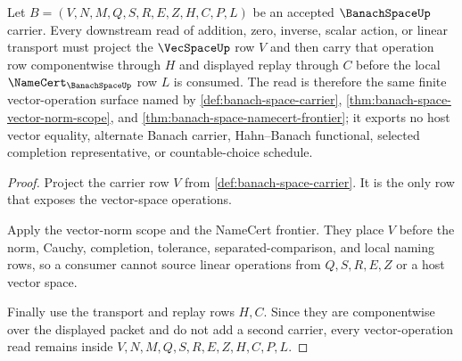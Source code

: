 \begin{theorem}
\label{thm:banach-space-vector-operation-transport-obligation}
Let $B=(V,N,M,Q,S,R,E,Z,H,C,P,L)$ be an accepted $\BanachSpaceUp$ carrier. Every downstream read of addition, zero, inverse, scalar action, or linear transport must project the $\VecSpaceUp$ row $V$ and then carry that operation row componentwise through $H$ and displayed replay through $C$ before the local $\NameCert_{\BanachSpaceUp}$ row $L$ is consumed. The read is therefore the same finite vector-operation surface named by \autoref{def:banach-space-carrier}, \autoref{thm:banach-space-vector-norm-scope}, and \autoref{thm:banach-space-namecert-frontier}; it exports no host vector equality, alternate Banach carrier, Hahn--Banach functional, selected completion representative, or countable-choice schedule.
\end{theorem}
\begin{proof}
Project the carrier row $V$ from \autoref{def:banach-space-carrier}. It is the only row that exposes the vector-space operations.

Apply the vector-norm scope and the NameCert frontier. They place $V$ before the norm, Cauchy, completion, tolerance, separated-comparison, and local naming rows, so a consumer cannot source linear operations from $Q,S,R,E,Z$ or a host vector space.

Finally use the transport and replay rows $H,C$. Since they are componentwise over the displayed packet and do not add a second carrier, every vector-operation read remains inside $V,N,M,Q,S,R,E,Z,H,C,P,L$.
\end{proof}

